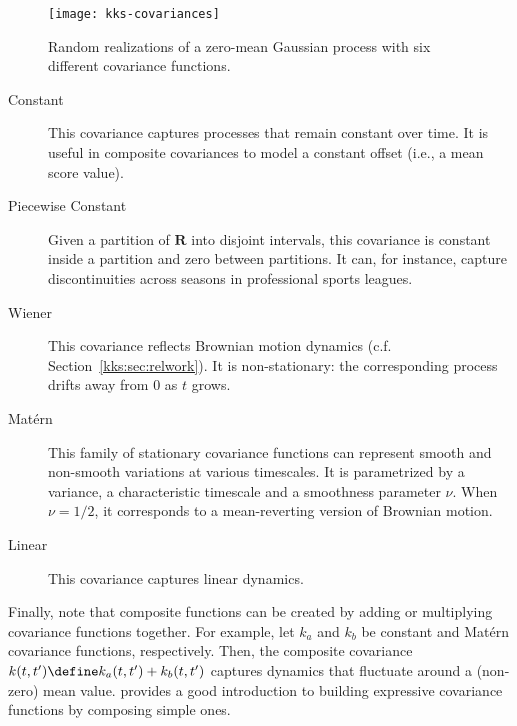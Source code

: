 \begin{figure*}[t]
	\texttt{[image: kks-covariances]}
	\caption{Random realizations of a zero-mean Gaussian process with six different covariance functions.}
	\label{kks:fig:covariances}
\end{figure*}

\begin{description}
	\item[Constant] This covariance captures processes that remain constant over time.
	      It is useful in composite covariances to model a constant offset (i.e., a mean score value).

	\item[Piecewise Constant]
	      Given a partition of $\mathbf{R}$ into disjoint intervals, this covariance is constant inside a partition and zero between partitions.
	      It can, for instance, capture discontinuities across seasons in professional sports leagues.

	\item[Wiener] This covariance reflects Brownian motion dynamics (c.f. Section~\ref{kks:sec:relwork}).
	      It is non-stationary: the corresponding process drifts away from $0$ as $t$ grows.

	\item[Matérn] This family of stationary covariance functions can represent smooth and non-smooth variations at various timescales.
	      It is parametrized by a variance, a characteristic timescale and a smoothness parameter $\nu$.
	      When $\nu = 1/2$, it corresponds to a mean-reverting version of Brownian motion.

	\item[Linear] This covariance captures linear dynamics.
\end{description}

Finally, note that composite functions can be created by adding or multiplying covariance functions together.
For example, let $k_a$ and $k_b$ be constant and Matérn covariance functions, respectively.
Then, the composite covariance $k(t, t') \define k_a(t, t') + k_b(t, t')$ captures dynamics that fluctuate around a (non-zero) mean value.
\citet[Section 2.3]{duvenaud2014automatic} provides a good introduction to building expressive covariance functions by composing simple ones.

